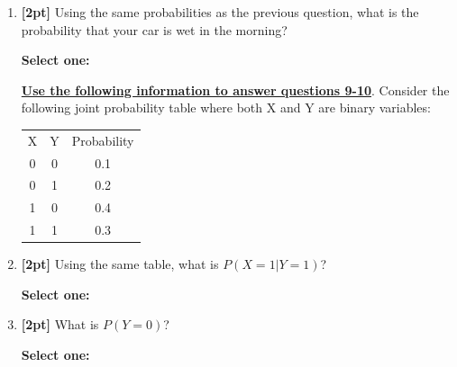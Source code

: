\documentclass[12pt]{article}
\renewcommand{\circle}{\tikz\draw[black] (0,0) circle (1ex);}
\begin{document}
\begin{enumerate}
    \item \textbf{[2pt]} Using the same probabilities as the previous question, what is the probability that your car is wet in the morning?

    \textbf{Select one:}


    
    \bigskip\bigskip\bigskip
    \textbf{\underline{Use the following information to answer questions 9-10}}. Consider the following joint probability table where both X and Y are binary variables:\\[12pt] 
    \begin{tabular}{ccc}
    X & Y & Probability \\
    0 & 0 & 0.1\\
    0 & 1 & 0.2\\
    1 & 0 & 0.4\\
    1 & 1 & 0.3
    \end{tabular}


    \item \textbf{[2pt]} Using the same table, what is $P(X = 1 | Y=1)$?

    \textbf{Select one:}



\clearpage
    \item \textbf{[2pt]} What is $P(Y=0)$?

    \textbf{Select one:}



\end{enumerate}
\end{document}
